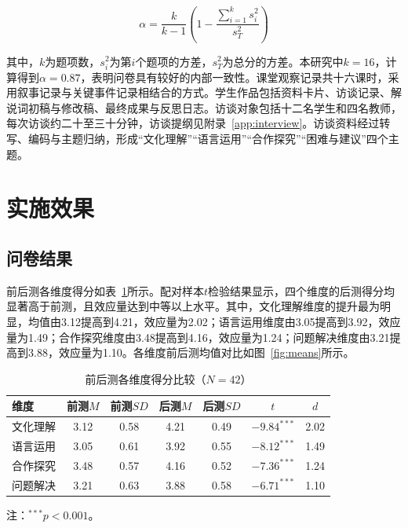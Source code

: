 \begin{equation}
  \alpha=\frac{k}{k-1}\left(1-\frac{\sum_{i=1}^{k}s_i^2}{s_T^2}\right)
  \label{eq:alpha}
\end{equation}

其中，$k$为题项数，$s_i^2$为第$i$个题项的方差，$s_T^2$为总分的方差。本研究中$k=16$，计算得到$\alpha=0.87$，表明问卷具有较好的内部一致性。课堂观察记录共十六课时，采用叙事记录与关键事件记录相结合的方式。学生作品包括资料卡片、访谈记录、解说词初稿与修改稿、最终成果与反思日志。访谈对象包括十二名学生和四名教师，每次访谈约二十至三十分钟，访谈提纲见附录~\ref{app:interview}。访谈资料经过转写、编码与主题归纳，形成“文化理解”“语言运用”“合作探究”“困难与建议”四个主题。

\section{实施效果}

\subsection{问卷结果}

前后测各维度得分如表~\ref{tab:results}所示。配对样本$t$检验结果显示，四个维度的后测得分均显著高于前测，且效应量达到中等以上水平。其中，文化理解维度的提升最为明显，均值由3.12提高到4.21，效应量为2.02；语言运用维度由3.05提高到3.92，效应量为1.49；合作探究维度由3.48提高到4.16，效应量为1.24；问题解决维度由3.21提高到3.88，效应量为1.10。各维度前后测均值对比如图~\ref{fig:means}所示。

\begin{table}[htbp]
  \centering
  \caption{前后测各维度得分比较（$N=42$）}
  \label{tab:results}
  \begin{tabular}{@{}lcccccc@{}}
    \toprule
    维度 & 前测$M$ & 前测$SD$ & 后测$M$ & 后测$SD$ & $t$ & $d$ \\
    \midrule
    文化理解 & 3.12 & 0.58 & 4.21 & 0.49 & $-9.84^{***}$ & 2.02 \\
    语言运用 & 3.05 & 0.61 & 3.92 & 0.55 & $-8.12^{***}$ & 1.49 \\
    合作探究 & 3.48 & 0.57 & 4.16 & 0.52 & $-7.36^{***}$ & 1.24 \\
    问题解决 & 3.21 & 0.63 & 3.88 & 0.58 & $-6.71^{***}$ & 1.10 \\
    \bottomrule
  \end{tabular}
  \par\smallskip
  {注：$^{***}p<0.001$。}
\end{table}

